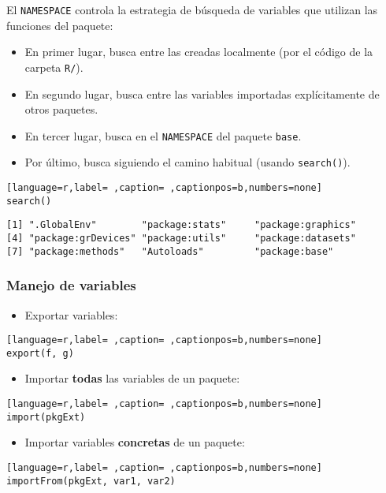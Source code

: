 El \texttt{NAMESPACE} controla la estrategia de búsqueda de variables que utilizan las funciones del paquete:
\begin{itemize}
\item En primer lugar, busca entre las creadas localmente (por el código de la carpeta \texttt{R/}).
\item En segundo lugar, busca entre las variables importadas explícitamente de otros paquetes.
\item En tercer lugar, busca en el \texttt{NAMESPACE} del paquete \texttt{base}.
\item Por último, busca siguiendo el camino habitual (usando \texttt{search()}).
\end{itemize}
\begin{lstlisting}[language=r,label= ,caption= ,captionpos=b,numbers=none]
search()
\end{lstlisting}

\begin{verbatim}
[1] ".GlobalEnv"        "package:stats"     "package:graphics" 
[4] "package:grDevices" "package:utils"     "package:datasets" 
[7] "package:methods"   "Autoloads"         "package:base"     
\end{verbatim}

\subsubsection{Manejo de variables}
\label{sec:orgb2d3edb}
\begin{itemize}
\item Exportar variables:
\end{itemize}
\begin{lstlisting}[language=r,label= ,caption= ,captionpos=b,numbers=none]
export(f, g)
\end{lstlisting}
\begin{itemize}
\item Importar \textbf{todas} las variables de un paquete:
\end{itemize}
\begin{lstlisting}[language=r,label= ,caption= ,captionpos=b,numbers=none]
import(pkgExt)
\end{lstlisting}
\begin{itemize}
\item Importar variables \textbf{concretas} de un paquete:
\end{itemize}
\begin{lstlisting}[language=r,label= ,caption= ,captionpos=b,numbers=none]
importFrom(pkgExt, var1, var2)
\end{lstlisting}
